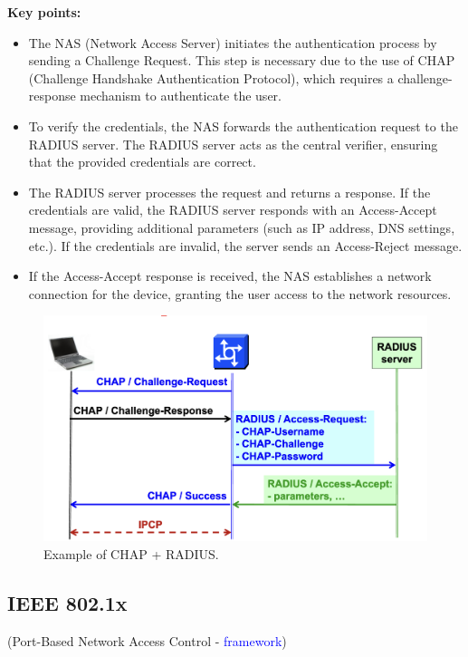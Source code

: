 \hfill

\textbf{Key points:}
\begin{itemize}
    \item The NAS (Network Access Server) initiates the authentication process by sending a Challenge Request. This step is necessary due to the use of CHAP (Challenge Handshake Authentication Protocol), which requires a challenge-response mechanism to authenticate the user.
    \item To verify the credentials, the NAS forwards the authentication request to the RADIUS server. The RADIUS server acts as the central verifier, ensuring that the provided credentials are correct.
    \item The RADIUS server processes the request and returns a response. If the credentials are valid, the RADIUS server responds with an Access-Accept message, providing additional parameters (such as IP address, DNS settings, etc.). If the credentials are invalid, the server sends an Access-Reject message.
    \item If the Access-Accept response is received, the NAS establishes a network connection for the device, granting the user access to the network resources.
    \end{itemize}

\begin{figure}[H]
    \includegraphics[width=\linewidth]{Images/NetSec/chap_plus_radius.png}
    \caption{Example of CHAP + RADIUS.}
    \label{fig:chap_plus_radius}
\end{figure}

\subsection{IEEE 802.1x}
\begin{center}
    (Port-Based Network Access Control - \textcolor{blue}{framework})
\end{center}

